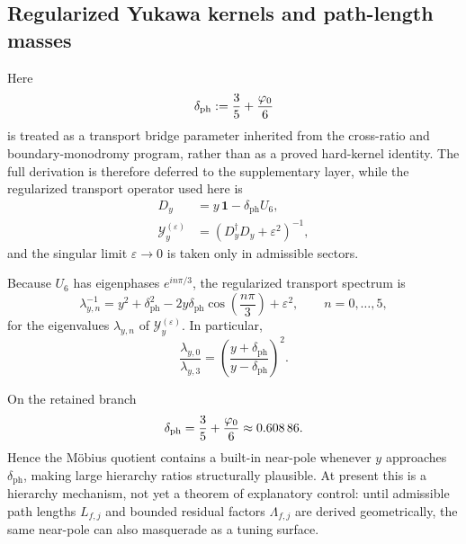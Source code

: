 \subsection{Regularized Yukawa kernels and path-length masses}

Here
\begin{equation}
\label{eq:transport-bridge-offset}
\delta_{\mathrm{ph}}:=\frac35+\frac{\varphi_0}{6}
\end{equation}
is treated as a transport bridge parameter inherited from the cross-ratio and boundary-monodromy program, rather than as a proved hard-kernel identity. The full derivation is therefore deferred to the supplementary layer, while the regularized transport operator used here is
\begin{equation}
\label{eq:yukawa-kernel}
\begin{aligned}
D_y&=y\,\mathbf 1-\delta_{\mathrm{ph}}U_6,\\
\mathcal Y_y^{(\varepsilon)}&=(D_y^\dagger D_y+\varepsilon^2)^{-1},
\end{aligned}
\end{equation}
and the singular limit $\varepsilon\to0$ is taken only in admissible sectors.

Because $U_6$ has eigenphases $e^{in\pi/3}$, the regularized transport spectrum is
\begin{equation}
\label{eq:transport-spectrum}
\lambda_{y,n}^{-1}
=
y^2+\delta_{\mathrm{ph}}^2-2y\delta_{\mathrm{ph}}\cos\!\left(\frac{n\pi}{3}\right)+\varepsilon^2,
\qquad
n=0,\dots,5,
\end{equation}
for the eigenvalues $\lambda_{y,n}$ of $\mathcal Y_y^{(\varepsilon)}$. In particular,
\begin{equation}
\label{eq:mobius-quotient}
\frac{\lambda_{y,0}}{\lambda_{y,3}}
=
\left(\frac{y+\delta_{\mathrm{ph}}}{y-\delta_{\mathrm{ph}}}\right)^2.
\end{equation}
\begin{remark}
On the retained branch
\[
\delta_{\mathrm{ph}}=\frac35+\frac{\varphi_0}{6}\approx \num{0.60886}.
\]
Hence the Möbius quotient contains a built-in near-pole whenever $y$ approaches $\delta_{\mathrm{ph}}$, making large hierarchy ratios structurally plausible. At present this is a hierarchy mechanism, not yet a theorem of explanatory control: until admissible path lengths $L_{f,j}$ and bounded residual factors $\Lambda_{f,j}$ are derived geometrically, the same near-pole can also masquerade as a tuning surface.
\end{remark}

